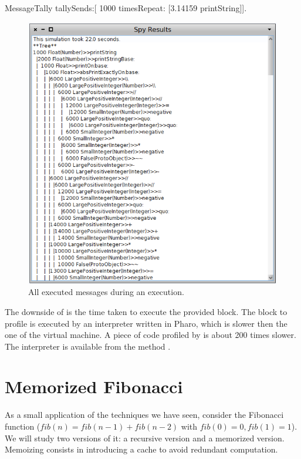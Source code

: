 \documentclass[a4paper,10pt,twoside]{book}
\begin{document}
\begin{code}{}
MessageTally tallySends:[ 1000 timesRepeat:  [3.14159 printString]].
\end{code}

\begin{figure}
	\begin{center}
	\includegraphics[width=.9\linewidth]{sendTally}
	\caption{All executed messages during an execution.}
	\end{center}
\end{figure}

The downside of  is the time taken to execute the provided block. The block to profile is executed by an interpreter written in Pharo, which is slower then the one of the virtual machine. A piece of code profiled by  is about 200 times slower. The interpreter is available from the method .

\section{Memorized Fibonacci}

As a small application of the techniques we have seen, consider the Fibonacci function ($fib (n) = fib (n-1) + fib(n-2)$ with $fib(0)=0, fib(1)=1$). We will study two versions of it: a recursive version and a memorized version. Memoizing consists in introducing a cache to avoid redundant computation.
\end{document}
